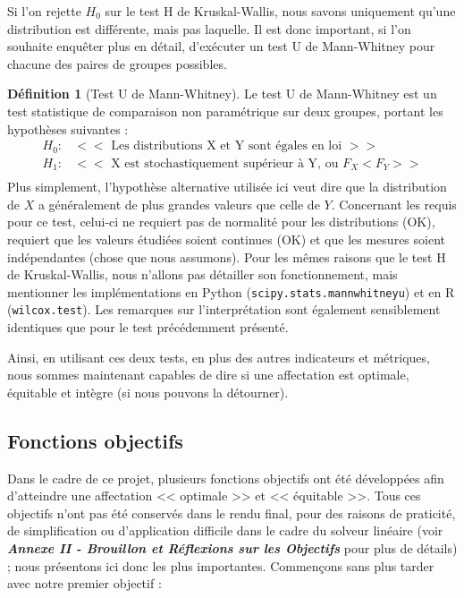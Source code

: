 \documentclass{rapport}
\theoremstyle{definition}
\newtheorem{definition}{Définition}
\theoremstyle{remark}
\theoremstyle{plain}
\theoremstyle{definition}
\theoremstyle{definition}
\theoremstyle{remark}
\theoremstyle{definition}
\begin{document}
Si l'on rejette $H_0$ sur le test H de Kruskal-Wallis, nous savons uniquement qu'une distribution est différente, mais pas laquelle. Il est donc important, si l'on souhaite enquêter plus en détail, d'exécuter un test U de Mann-Whitney pour chacune des paires de groupes possibles.
\begin{definition}[Test U de Mann-Whitney]
    Le test U de Mann-Whitney est un test statistique de comparaison non paramétrique sur deux groupes, portant les hypothèses suivantes :
    $$
    \begin{matrix}
        H_0 : & << \text{ Les distributions X et Y sont égales en loi } >>\\
        H_1 : & << \text{ X est stochastiquement supérieur à Y, ou } F_X<F_Y >>\\
    \end{matrix}
    $$
    Plus simplement, l'hypothèse alternative utilisée ici veut dire que la distribution de $X$ a généralement de plus grandes valeurs que celle de $Y$.
    Concernant les requis pour ce test, celui-ci ne requiert pas de normalité pour les distributions (OK), requiert que les valeurs étudiées soient continues (OK) et que les mesures soient indépendantes (chose que nous assumons).
    Pour les mêmes raisons que le test H de Kruskal-Wallis, nous n'allons pas détailler son fonctionnement, mais mentionner les implémentations en Python (\texttt{scipy.stats.mannwhitneyu}) et en R (\texttt{wilcox.test}).
    Les remarques sur l'interprétation sont également sensiblement identiques que pour le test précédemment présenté.
\end{definition}

Ainsi, en utilisant ces deux tests, en plus des autres indicateurs et métriques, nous sommes maintenant capables de dire si une affectation est optimale, équitable et intègre (si nous pouvons la détourner).

\subsection{Fonctions objectifs}
Dans le cadre de ce projet, plusieurs fonctions objectifs ont été développées afin d'atteindre une affectation << optimale >> et << équitable >>.
Tous ces objectifs n'ont pas été conservés dans le rendu final, pour des raisons de praticité, de simplification ou d'application difficile dans le cadre du solveur linéaire (voir \textbf{\textit{Annexe II - Brouillon et Réflexions sur les Objectifs}} pour plus de détails) ; nous présentons ici donc les plus importantes.
Commençons sans plus tarder avec notre premier objectif :
\end{document}
